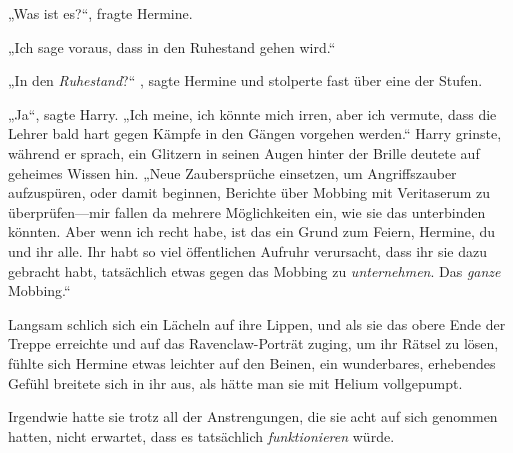 „Was ist es?“, fragte Hermine.

„Ich sage voraus, dass \SPHEW in den Ruhestand gehen wird.“

„In den \emph{Ruhestand}?“ , sagte Hermine und stolperte fast über eine der Stufen.

„Ja“, sagte Harry. „Ich meine, ich könnte mich irren, aber ich vermute, dass die Lehrer bald hart gegen Kämpfe in den Gängen vorgehen werden.“ Harry grinste, während er sprach, ein Glitzern in seinen Augen hinter der Brille deutete auf geheimes Wissen hin. „Neue Zaubersprüche einsetzen, um Angriffszauber aufzuspüren, oder damit beginnen, Berichte über Mobbing mit Veritaserum zu überprüfen—mir fallen da mehrere Möglichkeiten ein, wie sie das unterbinden könnten. Aber wenn ich recht habe, ist das ein Grund zum Feiern, Hermine, du und ihr alle. Ihr habt so viel öffentlichen Aufruhr verursacht, dass ihr sie dazu gebracht habt, tatsächlich etwas gegen das Mobbing zu \emph{unternehmen}. Das \emph{ganze} Mobbing.“

Langsam schlich sich ein Lächeln auf ihre Lippen, und als sie das obere Ende der Treppe erreichte und auf das Ravenclaw-Porträt zuging, um ihr Rätsel zu lösen, fühlte sich Hermine etwas leichter auf den Beinen, ein wunderbares, erhebendes Gefühl breitete sich in ihr aus, als hätte man sie mit Helium vollgepumpt.

Irgendwie hatte sie trotz all der Anstrengungen, die sie acht auf sich genommen hatten, nicht erwartet, dass es tatsächlich \emph{funktionieren} würde.

